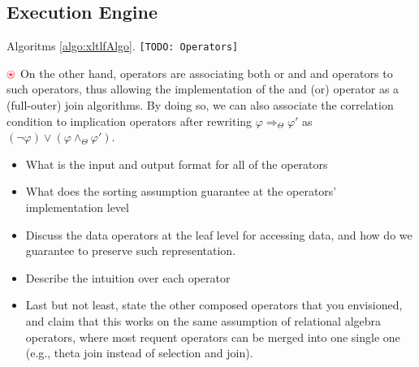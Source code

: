 
\subsection{Execution Engine} \label{ssec:xltlf}
Algoritms \ref{algo:xltlfAlgo}. \texttt{\color{red}[TODO: \xLTLf Operators]} 

\begin{mdframed}[hidealllines=true,backgroundcolor=orange!20]
	{$\color{red}\ostar$} On the other hand, \xLTLf operators are associating both or and and operators to such operators, thus allowing the implementation of the and (or) operator as a (full-outer) join algorithms. By doing so, we can also associate the correlation condition to implication operators after rewriting $\varphi\Rightarrow_\Theta\varphi'$ as $(\neg\varphi)\vee(\varphi\wedge_\Theta\varphi')$.
\end{mdframed}

\begin{itemize}
	\item What is the input and output format for all of the operators
	\item What does the sorting assumption guarantee at the operators' implementation level
	\item Discuss the data operators at the leaf level for accessing data, and how do we guarantee to preserve such representation.
	\item Describe the intuition over each operator
	\item Last but not least, state the other composed operators that you envisioned, and claim that this works on the same assumption of relational algebra operators, where most requent operators can be merged into one single one (e.g., theta join instead of selection and join).
\end{itemize}